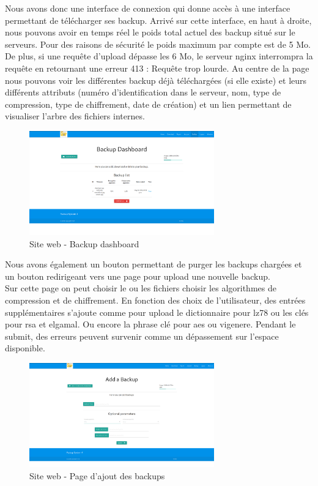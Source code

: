     \newpage

	Nous avons donc une interface de connexion qui donne accès à une interface permettant de télécharger ses backup. Arrivé sur cette interface, en haut à droite, nous pouvons avoir en temps réel le poids total actuel des backup situé sur le serveurs. Pour des raisons de sécurité le poids maximum par compte est de 5 Mo. De plus, si une requête d'upload dépasse les 6 Mo, le serveur nginx interrompra la requête en retournant une erreur 413 : Requête trop lourde. Au centre de la page nous pouvons voir les différentes backup déjà téléchargées (si elle existe) et leurs différents attributs (numéro d'identification dans le serveur, nom, type de compression, type de chiffrement, date de création) et un lien permettant de visualiser l'arbre des fichiers internes. 
	 \begin{figure}[!h]
		\centering
		\includegraphics[width=8cm]{images/website_dashboard.png}
		\caption{Site web - Backup dashboard}
		\label{Site web - Backup dashboard}
	\end{figure}
	
	Nous avons également un bouton permettant de purger les backups chargées et un bouton redirigeant vers une page pour upload une nouvelle backup.\\
	Sur cette page on peut choisir le ou les fichiers choisir les algorithmes de compression et de chiffrement. En fonction des choix de l'utilisateur, des entrées supplémentaires s'ajoute comme pour upload le dictionnaire pour lz78 ou les clés pour rsa et elgamal. Ou encore la phrase clé pour aes ou vigenere. Pendant le submit, des erreurs peuvent survenir comme un dépassement sur l'espace disponible.
	\begin{figure}[!h]
		\centering
		\includegraphics[width=8cm]{images/website_add_backup.png}
		\caption{Site web - Page d'ajout des backups}
		\label{Site web - Page d'ajout des backups}
    \end{figure}
	

